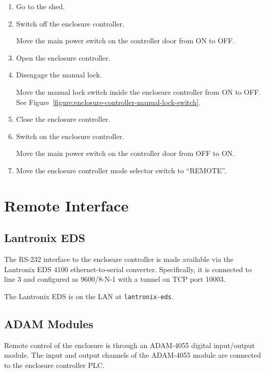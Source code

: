 \begin{enumerate}
\item
Go to the shed.

\item Switch off the enclosure controller.

Move the main power switch on the controller door from ON to OFF.

\item Open the enclosure controller.

\item
Disengage the manual lock.

Move the manual lock switch inside the enclosure controller from ON to OFF. See Figure~\ref{figure:enclosure-controller-manual-lock-switch}.

\item
Close the enclosure controller.

\item Switch on the enclosure controller.

Move the main power switch on the controller door from OFF to ON.

\item Move the enclosure controller mode selector switch to “REMOTE”.

\end{enumerate}

\section{Remote Interface}

\subsection{Lantronix EDS}

The RS-232 interface to the enclosure controller is made available via the Lantronix EDS 4100 ethernet-to-serial converter. Specifically, it is connected to line 3 and configured as 9600/8-N-1 with a tunnel on TCP port 10003.

The Lantronix EDS is on the LAN at \verb|lantronix-eds|.

\subsection{ADAM Modules}
\label{section:enclosure-adam-modules}

Remote control of the enclosure is through an ADAM-4055 digital input/output module. The input and output channels of the ADAM-4055 module are connected to the enclosure controller PLC.

